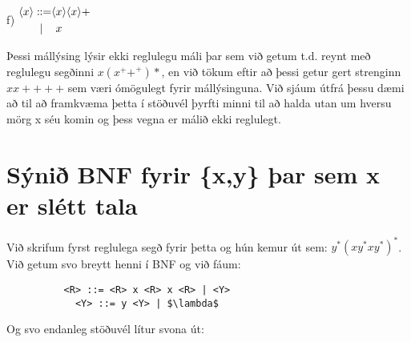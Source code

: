 \documentclass[leqno]{article}
\begin{document}
\begin{itemize}
\begin{minipage}{.80\linewidth}
\end{minipage}

\vspace{3em}

\begin{minipage}{.20\linewidth}
			\item[f)] $\begin{alignedat}{3}
\langle & x & \rangle :& \hspace{-.3em}:= & \langle & x \rangle  \langle x \rangle +\\
		&   &          &  |               & & x \\
    \end{alignedat}$
\end{minipage}
\begin{minipage}{.80\linewidth}
	Þessi mállýsing lýsir ekki reglulegu máli þar sem við getum t.d. reynt 
	með reglulegu segðinni $x(x^++^+)*$, en við tökum eftir að þessi getur 
	gert strenginn $xx++++$ sem væri ómögulegt fyrir mállýsinguna. Við 
	sjáum útfrá þessu dæmi að til að framkvæma þetta í stöðuvél þyrfti 
	minni til að halda utan um hversu mörg x séu komin og þess vegna er 
	málið ekki reglulegt.

\end{minipage}
\end{itemize}

\section{Sýnið BNF fyrir \{x,y\} þar sem x er slétt tala}

Við skrifum fyrst reglulega segð fyrir þetta og hún kemur út sem: 
$y^*(xy^*xy^*)^*$. Við getum svo breytt henni í BNF og við fáum:
\begin{lstlisting}
		  <R> ::= <R> x <R> x <R> | <Y>
		  	<Y> ::= y <Y> | $\lambda$
\end{lstlisting}

Og svo endanleg stöðuvél lítur svona út:

\begin{center}
\end{center}
\end{document}
